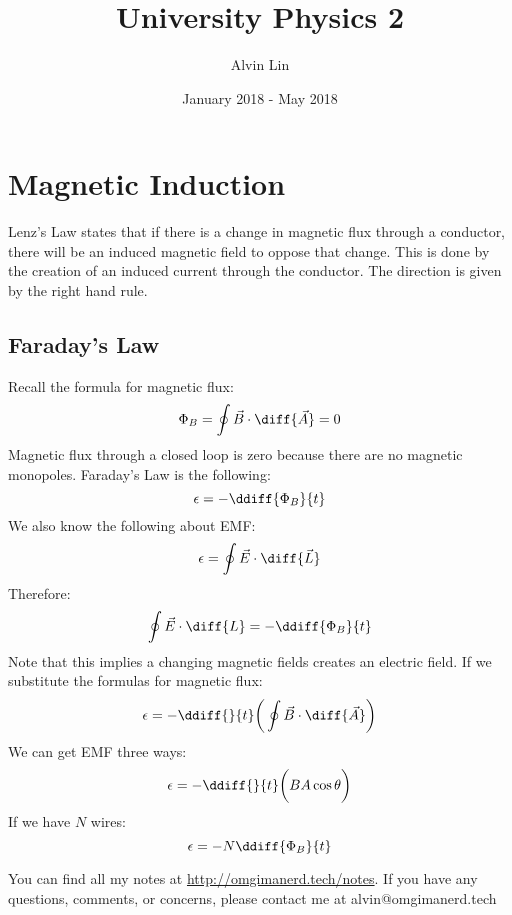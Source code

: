 \documentclass{math}
\title{University Physics 2}
\author{Alvin Lin}
\date{January 2018 - May 2018}
\begin{document}
\maketitle

\section*{Magnetic Induction}
Lenz's Law states that if there is a change in magnetic flux through a
conductor, there will be an induced magnetic field to oppose that change. This
is done by the creation of an induced current through the conductor. The
direction is given by the right hand rule.

\subsection*{Faraday's Law}
Recall the formula for magnetic flux:
\[ \Phi_B = \oint\vec{B}\cdot\diff{\vec{A}} = 0 \]
Magnetic flux through a closed loop is zero because there are no magnetic
monopoles. Faraday's Law is the following:
\[ \epsilon = -\ddiff{\Phi_B}{t} \]
We also know the following about EMF:
\[ \epsilon = \oint\vec{E}\cdot\diff{\vec{L}} \]
Therefore:
\[ \oint\vec{E}\cdot\diff{L} = -\ddiff{\Phi_B}{t} \]
Note that this implies a changing magnetic fields creates an electric field.
If we substitute the formulas for magnetic flux:
\[ \epsilon = -\ddiff{}{t}\bigg(\oint\vec{B}\cdot\diff{\vec{A}}\bigg) \]
We can get EMF three ways:
\[ \epsilon = -\ddiff{}{t}\bigg(BA\cos\theta\bigg) \]
If we have \( N \) wires:
\[ \epsilon = -N\ddiff{\Phi_B}{t} \]

\begin{center}
  You can find all my notes at \url{http://omgimanerd.tech/notes}. If you have
  any questions, comments, or concerns, please contact me at
  alvin@omgimanerd.tech
\end{center}
\end{document}
